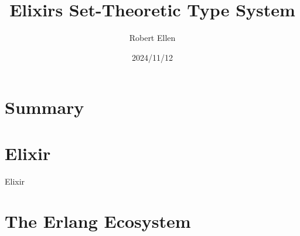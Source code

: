 \documentclass[
  ignorenonframetext,
  aspectratio=169]{beamer}
\title{Elixir\textquotesingle s Set-Theoretic Type System}
\author{Robert Ellen}
\date{2024/11/12}
\begin{document}
\frame{\titlepage}

\section{Summary}\label{summary}

\section{Elixir}\label{elixir-1}

\begin{frame}{Elixir}


\end{frame}

\section{The Erlang Ecosystem}\label{the-erlang-ecosystem}
\end{document}
